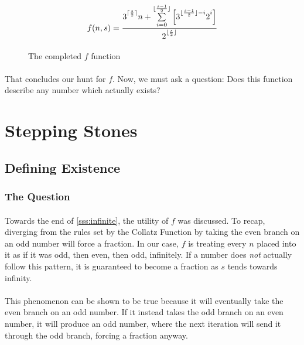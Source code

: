 \documentclass[12pt,letterpaper]{article}
\begin{document}
			\begin{figure}[h]
				\begin{equation*}
					f(n, s) = \frac{3\strut^{\lceil \frac{s}{2}	\rceil} n + 
						\sum\limits_{i=0}^
						{\lfloor \frac{s-1}{2} \rfloor} 
						\left[
							3\strut^{\lfloor \frac{s-1}{2} \rfloor - i}
							2\strut^i 
						\right]}
						{2\strut^{\lfloor \frac{s}{2} \rfloor}}
				\end{equation*}
				
				\caption{The completed $f$ function}
				\label{function:f}
			\end{figure}
		
			\paragraph{} That concludes our hunt for $f$. Now, we must ask a question: Does this function describe any number which actually exists?
			
\section{Stepping Stones}

	\subsection{Defining Existence}
	
		\subsubsection{The Question}
		
			\paragraph{} Towards the end of \ref{sss:infinite}, the utility of $f$ was discussed. To recap, diverging from the rules set by the Collatz Function by taking the even branch on an odd number will force a fraction. In our case, $f$ is treating every $n$ placed into it as if it was odd, then even, then odd, infinitely. If a number does \textit{not} actually follow this pattern, it is guaranteed to become a fraction as $s$ tends towards infinity. 
			
			\paragraph{} This phenomenon can be shown to be true because it will eventually take the even branch on an odd number. If it instead takes the odd branch on an even number, it will produce an odd number, where the next iteration will send it through the odd branch, forcing a fraction anyway.
			
\end{document}
